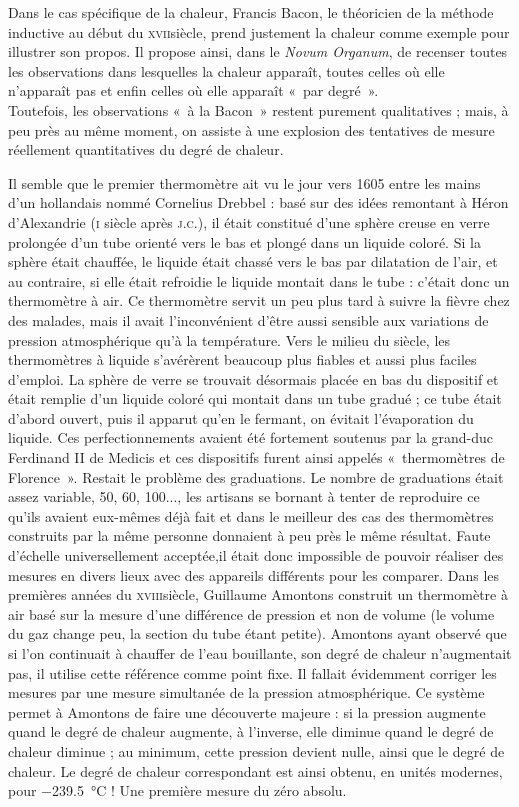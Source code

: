 	Dans le cas spécifique de la chaleur, Francis Bacon, le théoricien de la méthode inductive au début du \textsc{xvii}\ieme siècle, prend justement la chaleur comme exemple pour illustrer son propos. Il propose ainsi, dans le \textit{Novum Organum}, de recenser toutes les observations dans lesquelles la chaleur apparaît, toutes celles où elle n'apparaît pas et enfin celles où elle apparaît «~par degré~».\\
	Toutefois, les observations «~à la Bacon~» restent purement qualitatives ; mais, à peu près au même moment, on assiste à une explosion des tentatives de mesure réellement quantitatives du degré de chaleur.
	
	Il semble que le premier thermomètre ait vu le jour vers 1605 entre les mains d'un hollandais nommé Cornelius Drebbel\cite{locqueneux1996} : basé sur des idées remontant à Héron d'Alexandrie (\textsc{i}\xspace siècle après \textsc{j.c.}), il était constitué d'une sphère creuse en verre prolongée d'un tube orienté vers le bas et plongé dans un liquide coloré. Si la sphère était chauffée, le liquide était chassé vers le bas par dilatation de l'air, et au contraire, si elle était refroidie le liquide montait dans le tube : c'était donc un thermomètre à air. Ce thermomètre servit un peu plus tard à suivre la fièvre chez des malades, mais il avait l'inconvénient d'être aussi sensible aux variations de pression atmosphérique qu'à la température. Vers le milieu du siècle, les thermomètres à liquide s'avérèrent beaucoup plus fiables et aussi plus faciles d'emploi. La sphère de verre se trouvait désormais placée en bas du dispositif et était remplie d'un liquide coloré qui montait dans un tube gradué ; ce tube était d'abord ouvert, puis il apparut qu'en le fermant, on évitait l'évaporation du liquide. Ces perfectionnements avaient été fortement soutenus par la grand-duc Ferdinand II de Medicis et ces dispositifs furent ainsi appelés «~thermomètres de Florence~».
	Restait le problème des graduations. Le nombre de graduations était assez variable, 50, 60, 100..., les artisans se bornant à tenter de reproduire ce qu'ils avaient eux-mêmes déjà fait et dans le meilleur des cas des thermomètres construits par la même personne donnaient à peu près le même résultat. Faute d'échelle universellement acceptée,il était donc impossible de pouvoir réaliser des mesures en divers lieux avec des appareils différents pour les comparer.
	Dans les premières années du \textsc{xviii}\ieme siècle, Guillaume Amontons construit un thermomètre à air basé sur la mesure d'une différence de pression et non de volume (le volume du gaz change peu, la section du tube étant petite). Amontons ayant observé que si l'on continuait à chauffer de l'eau bouillante, son degré de chaleur n'augmentait pas, il utilise cette référence comme point fixe. Il fallait évidemment corriger les mesures par une mesure simultanée de la pression atmosphérique. Ce système permet à Amontons de faire une découverte majeure : si la pression augmente quand le degré de chaleur augmente, à l'inverse, elle diminue quand le degré de chaleur diminue ; au minimum, cette pression devient nulle, ainsi que le degré de chaleur. Le degré de chaleur correspondant est ainsi obtenu, en unités modernes, pour \SI{-239,5}{\degreeCelsius} ! Une première mesure du zéro absolu.
	

